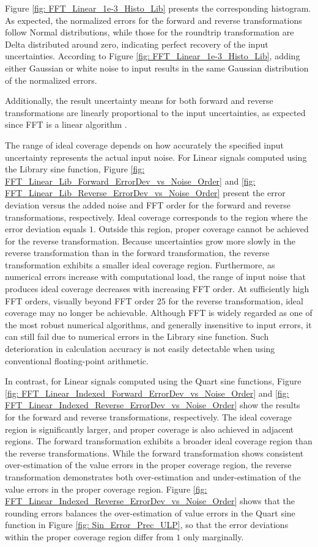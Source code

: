 \documentclass[twoside]{article}
\numberwithin{equation}{section}
\begin{document}
Figure \ref{fig: FFT_Linear_1e-3_Histo_Lib} presents the corresponding histogram.
As expected, the normalized errors for the forward and reverse transformations follow Normal distributions, while those for the roundtrip transformation are Delta distributed around zero, indicating perfect recovery of the input uncertainties.
According to Figure \ref{fig: FFT_Linear_1e-3_Histo_Lib}, adding either Gaussian or white noise to input results in the same Gaussian distribution of the normalized errors.

Additionally, the result uncertainty means for both forward and reverse transformations are linearly proportional to the input uncertainties, as expected since FFT is a linear algorithm \cite{Numerical_Recipes}.

The range of ideal coverage depends on how accurately the specified input uncertainty represents the actual input noise.  
For Linear signals computed using the Library sine function, Figure \ref{fig: FFT_Linear_Lib_Forward_ErrorDev_vs_Noise_Order} and \ref{fig: FFT_Linear_Lib_Reverse_ErrorDev_vs_Noise_Order} present the error deviation versus the added noise and FFT order for the forward and reverse transformations, respectively.
Ideal coverage corresponds to the region where the error deviation equals $1$.
Outside this region, proper coverage cannot be achieved for the reverse transformation.
Because uncertainties grow more slowly in the reverse transformation than in the forward transformation, the reverse transformation exhibits a smaller ideal coverage region.
Furthermore, as numerical errors increase with computational load, the range of input noise that produces ideal coverage decreases with increasing FFT order.
At sufficiently high FFT orders, visually beyond FFT order $25$ for the reverse transformation, ideal coverage may no longer be achievable.
Although FFT is widely regarded as one of the most robust numerical algorithms, and generally insensitive to input errors, it can still fail due to numerical errors in the Library sine function.
Such deterioration in calculation accuracy is not easily detectable when using conventional floating-point arithmetic.

In contrast, for Linear signals computed using the Quart sine functions, Figure \ref{fig: FFT_Linear_Indexed_Forward_ErrorDev_vs_Noise_Order} and \ref{fig: FFT_Linear_Indexed_Reverse_ErrorDev_vs_Noise_Order} show the results for the forward and reverse transformations, respectively. 
The ideal coverage region is significantly larger, and proper coverage is also achieved in adjacent regions.
The forward transformation exhibits a broader ideal coverage region than the reverse transformations.
While the forward transformation shows consistent over-estimation of the value errors in the proper coverage region, the reverse transformation demonstrates both over-estimation and under-estimation of the value errors in the proper coverage region.
Figure \ref{fig: FFT_Linear_Indexed_Reverse_ErrorDev_vs_Noise_Order} shows that the rounding errors balances the over-estimation of value errors in the Quart sine function in Figure \ref{fig: Sin_Error_Prec_ULP}, so that the error deviations within the proper coverage region differ from $1$ only marginally.
\end{document}
